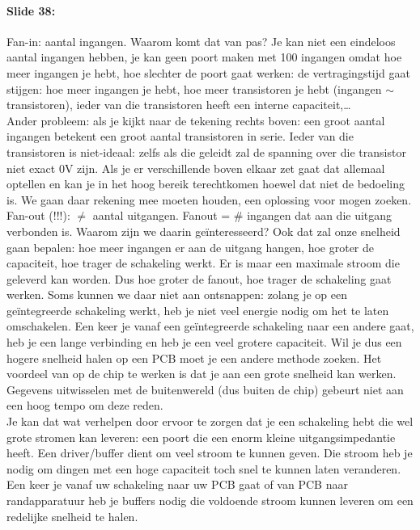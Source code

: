 \documentclass[10pt,a4paper]{book}
\begin{document}
\paragraph{Slide 38:} Fan-in: aantal ingangen. Waarom komt dat van pas? Je kan niet een eindeloos aantal ingangen hebben, je kan geen poort maken met 100 ingangen omdat hoe meer ingangen je hebt, hoe slechter de poort gaat werken: de vertragingstijd gaat stijgen: hoe meer ingangen je hebt, hoe meer transistoren je hebt (ingangen $\sim$transistoren), ieder van die transistoren heeft een interne capaciteit,\ldots \\
Ander probleem: als je kijkt naar de tekening rechts boven: een groot aantal ingangen betekent een groot aantal transistoren in serie. Ieder van die transistoren is niet-ideaal: zelfs als die geleidt zal de spanning over die transistor niet exact 0V zijn. Als je er verschillende boven elkaar zet gaat dat allemaal optellen en kan je in het hoog bereik terechtkomen hoewel dat niet de bedoeling is. We gaan daar rekening mee moeten houden, een oplossing voor mogen zoeken.\\
Fan-out (!!!): $\neq$ aantal uitgangen. Fanout = \# ingangen dat aan die uitgang verbonden is. Waarom zijn we daarin ge\"interesseerd? Ook dat zal onze snelheid gaan bepalen: hoe meer ingangen er aan de uitgang hangen, hoe groter de capaciteit, hoe trager de schakeling werkt. Er is maar een maximale stroom die geleverd kan worden.  Dus hoe groter de fanout, hoe trager de schakeling gaat werken. 
Soms kunnen we daar niet aan ontsnappen: zolang je op een ge\"integreerde schakeling werkt, heb je niet veel energie nodig om het te laten omschakelen. Een keer je vanaf een ge\"integreerde schakeling naar een andere gaat, heb je een lange verbinding en heb je een veel grotere capaciteit. Wil je dus een hogere snelheid halen op een PCB moet je een andere methode zoeken. Het voordeel van op de chip te werken is dat je aan een grote snelheid kan werken. Gegevens uitwisselen met de buitenwereld (dus buiten de chip) gebeurt niet aan een hoog tempo om deze reden.\\
Je kan dat wat verhelpen door ervoor te zorgen dat je een schakeling hebt die wel grote stromen kan leveren: een poort die een enorm kleine uitgangsimpedantie heeft. 
Een driver/buffer dient om veel stroom te kunnen geven. Die stroom heb je nodig om dingen met een hoge capaciteit toch snel te kunnen laten veranderen. Een keer je vanaf uw schakeling naar uw PCB gaat of van PCB naar randapparatuur heb je buffers nodig die voldoende stroom kunnen leveren om een redelijke snelheid te halen.
\end{document}
